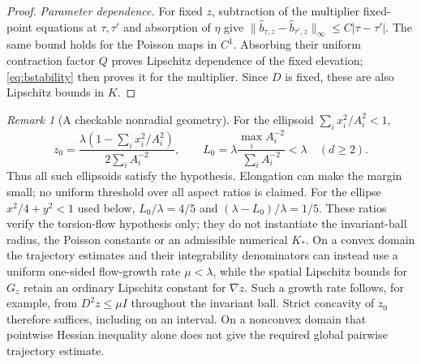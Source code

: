 \documentclass[11pt,a4paper]{article}
\theoremstyle{definition}\newtheorem{definition}[theorem]{Definition}
\theoremstyle{remark}\newtheorem{remark}[theorem]{Remark}
\begin{document}
\begin{proof}
\emph{Parameter dependence.} For fixed $z$, subtraction of the multiplier
fixed-point equations at $\tau,\tau'$ and absorption of $\eta$ give
$\|\widehat b_{\tau,z}-\widehat b_{\tau',z}\|_\infty\leq C|\tau-\tau'|$.
The same bound holds for the Poisson maps in $C^1$. Absorbing their uniform
contraction factor $Q$ proves Lipschitz dependence of the fixed elevation;
\eqref{eq:bstability} then proves it for the multiplier. Since $D$ is fixed,
these are also Lipschitz bounds in $K$.
\end{proof}

\begin{remark}[A checkable nonradial geometry]
For the ellipsoid $\sum_i x_i^2/A_i^2<1$,
\[
 z_0=\frac{\lambda(1-\sum_i x_i^2/A_i^2)}{2\sum_i A_i^{-2}},\qquad
 L_0=\lambda\frac{\max_i A_i^{-2}}{\sum_i A_i^{-2}}<\lambda\quad(d\geq2).
\]
Thus all such ellipsoids satisfy the hypothesis. Elongation can make the
margin small; no uniform threshold over all aspect ratios is claimed.
For the ellipse $x^2/4+y^2<1$ used below,
$L_0/\lambda=4/5$ and $(\lambda-L_0)/\lambda=1/5$.
These ratios verify the torsion-flow hypothesis only; they do not instantiate
the invariant-ball radius, the Poisson constants or an admissible numerical $K_*$.
On a convex domain the trajectory estimates and their integrability denominators
can instead use a uniform one-sided flow-growth rate $\mu<\lambda$, while
the spatial Lipschitz bounds for $G_z$ retain an ordinary Lipschitz constant
for $\nabla z$. Such a growth rate follows, for example, from
$D^2z\leq\mu I$ throughout the invariant ball. Strict concavity of $z_0$
therefore suffices, including on an interval. On a nonconvex domain that
pointwise Hessian inequality alone does not give the required global
pairwise trajectory estimate.
\end{remark}
\end{document}
